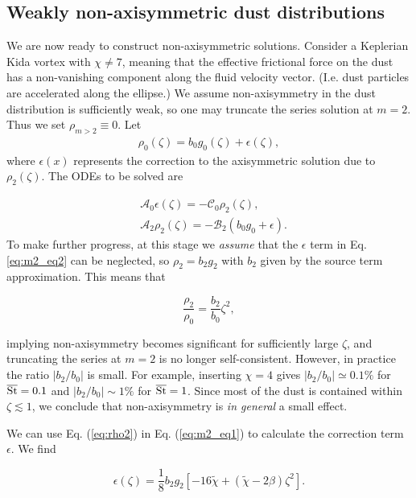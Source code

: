 \documentclass[apj]{emulateapj}
\newcommand{\Eq}[1]{Eq. (\ref{#1})}
\newcommand{\eq}[1]{\Eq{#1}}
\newcommand{\beq}{\begin{equation}}
\newcommand{\eeq}{\end{equation}}
\newcommand{\tilchi}{\tilde\chi}
\newcommand{\St}{{\rm St}}
\begin{document}
\subsection{Weakly non-axisymmetric dust distributions}
We are now ready to construct non-axisymmetric solutions. 
Consider a Keplerian Kida vortex with $\chi\neq 7$, meaning that the effective 
frictional force on the dust has a non-vanishing component along the
fluid velocity vector. (I.e. dust particles are accelerated along the
ellipse.) We assume non-axisymmetry in the dust distribution is
sufficiently weak, so one may truncate the series solution at
$m=2$. Thus we set $\rho_{m>2}\equiv0$. Let
\begin{align}
\rho_0(\zeta) = b_0 g_0(\zeta) + \epsilon(\zeta),
\end{align}
where $\epsilon(x)$ represents the correction to the axisymmetric
solution due to $\rho_2(\zeta)$. The ODEs to be solved are

\begin{align}
&\mathcal{A}_0\epsilon(\zeta) = -\mathcal{C}_0\rho_2(\zeta),\label{eq:m2_eq1}\\
&\mathcal{A}_2\rho_2(\zeta)   = -\mathcal{B}_2\left(b_0g_0 + \epsilon\right).\label{eq:m2_eq2}
\end{align}
To make further progress, at this stage we \emph{assume} that the
$\epsilon$ term in Eq. \ref{eq:m2_eq2} can be neglected, so $\rho_2 = b_2 g_2$ with $b_2$ given by the source term approximation. 
This means that  

\beq\label{eq:rho2}
\frac{\rho_2}{\rho_0} = \frac{b_2}{b_0}\zeta^2,
\eeq

\noindent implying non-axisymmetry becomes significant for sufficiently large $\zeta$, 
and truncating the series at $m=2$ is no longer self-consistent. 
However, in practice the ratio $|b_2/b_0|$ is small. 
For example, inserting $\chi=4$ gives $|b_2/b_0|\simeq0.1\%$ for
$\overline{\St}=0.1$ and $|b_2/b_0|\sim 1\%$ for $\overline{\St}=1$. Since
most of the dust is contained within $\zeta\lesssim 1$, we conclude that
non-axisymmetry is {\it in general} a small effect.

We can use \eq{eq:rho2} in \eq{eq:m2_eq1} to
calculate the correction term $\epsilon$. We find

\beq
\epsilon(\zeta) = \frac{1}{8}b_2g_2\left[-16\tilchi+\left(\tilchi - 2\beta\right)\zeta^2\right].
\eeq
\end{document}
